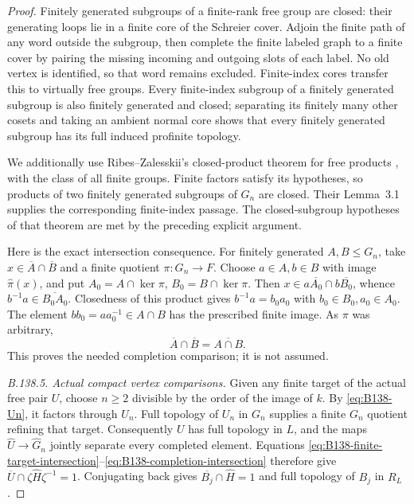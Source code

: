 \begin{proof}
Finitely generated subgroups of a finite-rank free group are closed:
their generating loops lie in a finite core of the Schreier cover.
Adjoin the finite path of any word outside the subgroup, then complete
the finite labeled graph to a finite cover by pairing the missing
incoming and outgoing slots of each label. No old vertex is identified,
so that word remains excluded. Finite-index cores transfer this to
virtually free groups. Every finite-index subgroup of a finitely
generated subgroup is also finitely generated and closed; separating
its finitely many other cosets and taking an ambient normal core
shows that every finitely generated subgroup has its full induced
profinite topology.

We additionally use Ribes--Zalesskii's closed-product theorem for
free products \cite[Theorem~3.13]{BRibesZalesskii2004FreeProducts},
with the class of all finite groups. Finite factors satisfy its
hypotheses, so products of two finitely generated subgroups of $G_n$
are closed. Their Lemma~3.1 supplies the corresponding finite-index
passage. The closed-subgroup hypotheses of that theorem are met by
the preceding explicit argument.

Here is the exact intersection consequence. For finitely generated
$A,B\le G_n$, take $x\in\overline A\cap\overline B$ and a finite
quotient $\pi:G_n\to F$. Choose $a\in A,b\in B$ with image
$\widehat\pi(x)$, and put $A_0=A\cap\ker\pi$, $B_0=B\cap\ker\pi$.
Then $x\in a\overline{A_0}\cap b\overline{B_0}$, whence
$b^{-1}a\in\overline{B_0A_0}$. Closedness of this product gives
$b^{-1}a=b_0a_0$ with $b_0\in B_0,a_0\in A_0$. The element
$bb_0=aa_0^{-1}\in A\cap B$ has the prescribed finite image.
As $\pi$ was arbitrary,
\begin{equation}\label{eq:B138-completion-intersection}
\overline A\cap\overline B=\overline{A\cap B}.
\end{equation}
This proves the needed completion comparison; it is not assumed.

\emph{B.138.5. Actual compact vertex comparisons.}
Given any finite target of the actual free pair $U$, choose $n\ge2$
divisible by the order of the image of $k$. By \eqref{eq:B138-Un},
it factors through $U_n$. Full topology of $U_n$ in $G_n$ supplies
a finite $G_n$ quotient refining that target. Consequently $U$ has
full topology in $L$, and the maps $\widehat U\to\widehat G_n$
jointly separate every completed element. Equations
\eqref{eq:B138-finite-target-intersection}--\eqref{eq:B138-completion-intersection}
therefore give $\overline U\cap\zeta\widehat H\zeta^{-1}=1$.
Conjugating back gives $\overline{B_j}\cap\widehat H=1$ and
full topology of $B_j$ in $R_L$.


\end{proof}
